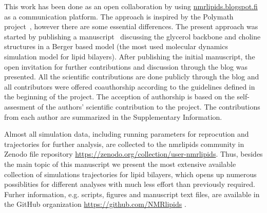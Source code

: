 \documentclass[journal=jacsat,manuscript=article]{achemso}
\begin{document}
This work has been done as an open collaboration by using \url{nmrlipids.blogspot.fi}
as a communication platform.
The approach is inspired by the Polymath project~\cite{gowers09}, however there are some essential differences. 
The present approach was started by publishing a manuscript~\cite{ollila13} discussing the glycerol backbone and choline structures 
in a Berger based model (the most used molecular dynamics simulation model for lipid bilayers).
After publishing the initial manuscript, the open invitation for further contributions and discussion through the blog was presented.
All the scientific contributions are done publicly through the blog and all contributors were offered coauthorship
according to the guidelines defined in the beginning of the project. 
The acception of authorship is based on the self-assesment of the authors' scientific contribution to the project.
The contributions from each author are summarized in the Supplementary Information. %

Almost all simulation data, including running parameters for reprocution and trajectories for further analysis, are collected
to the nmrlipids community in Zenodo file repository \url{https://zenodo.org/collection/user-nmrlipids}.
Thus, besides the main topic of this manuscript we present the most extensive available collection of simulations trajectories
for lipid bilayers, which opens up numerous possiblities for different analyses with much less effort than previously required.
Furher information, e.g. scripts, figures and manuscript text files, are available in the GitHub 
organization \url{https://github.com/NMRlipids} .
\end{document}
